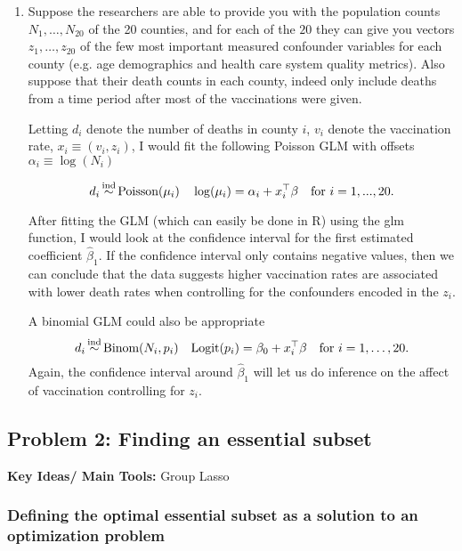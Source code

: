 \begin{enumerate}[label=(\alph*)]
\item Suppose the researchers are able to provide you with the population counts $N_1,\dots,N_{20}$ of the 20 counties, and for each of the $20$ they can give you vectors $z_1, \dots, z_{20}$ of the few most important measured confounder variables for each county (e.g. age demographics and health care system quality metrics). Also suppose that their death counts in each county, indeed only include deaths from a time period after most of the vaccinations were given.

Letting $d_i$ denote the number of deaths in county $i$, $v_i$ denote the vaccination rate, $x_i \equiv (v_i, z_i)$,  I would fit the following Poisson GLM with offsets $\alpha_i \equiv \log(N_i)$

$$d_i \simind \text{Poisson} (\mu_i) \quad \log(\mu_i)=\alpha_i + x_i^\top \beta \quad \text{for } i=1,...,20.$$

After fitting the GLM (which can easily be done in R) using the glm function, I would look at the confidence interval for the first estimated coefficient $\hat{\beta}_1$. If the confidence interval only contains negative values, then we can conclude that the data suggests higher vaccination rates are associated with lower death rates when controlling for the confounders encoded in the $z_i$. 

A binomial GLM could also be appropriate
\[ 
    d_i \simind \text{Binom}(N_i, p_i) \quad \logit(p_i) = \beta_0 + x_i^\top \beta \quad \text{for } i=1,\ldots,20.
\]
Again, the confidence interval around $\hat{\beta}_1$ will let us do inference on the affect of vaccination controlling for $z_i$.


\end{enumerate}

\subsection*{Problem 2: Finding an essential subset}

\textbf{Key Ideas/ Main Tools:} Group Lasso

\subsubsection*{Defining the optimal essential subset as a solution to an optimization problem}

